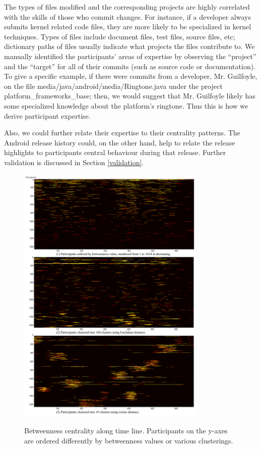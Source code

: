 \documentclass[conference]{IEEEtran}
\begin{document}
The types of files modified and the corresponding projects are highly
correlated with the skills of those who commit changes. For
instance, if a developer always submits kernel related code
files, they are more likely to be specialized in kernel techniques. Types of files
include document files, test files, source files, etc; dictionary paths of files usually indicate what projects the files contribute to. 
We manually identified the participants' areas of expertise by
observing the ``project'' and the
``target'' for all of their commits (such as source code or
documentation).
To give a specific example, if there were commits from a developer,
Mr. Guilfoyle, on the file
media/java/android/media/Ringtone.java under the project
platform\_frameworks\_base; then, we would suggest that Mr. Guilfoyle 
likely has some specialized knowledge about the platform's ringtone. 
Thus this is how we derive participant expertise.

Also, we could further relate their expertise to their centrality
patterns. The Android release history could, on the other hand, help
to relate the release highlights to participants central behaviour during
that release. Further validation is discussed in Section
\ref{validation}. 



\begin{figure}[!t]
\centerline{\includegraphics[width=3.54in]{cluster_comp.png}
\label{cluster_comp}}
\caption{Betweenness centrality along time line. Participants on the y-axes are ordered differently by betweenness values or various clusterings. }
\end{figure}
\end{document}
